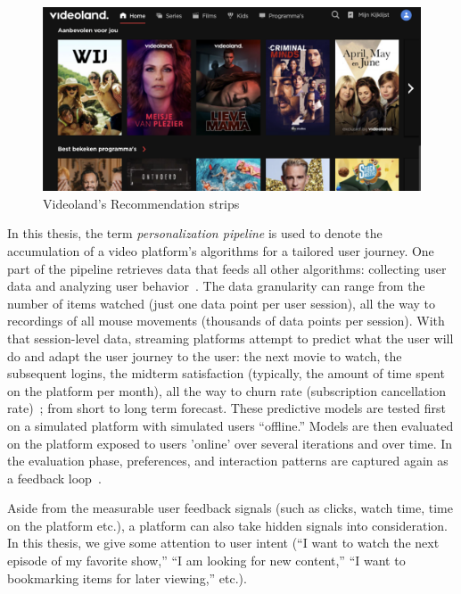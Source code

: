 \begin{figure}[h]
  \centering
  \includegraphics[width=\textwidth]{images/VLHome_cropped.png}
  \caption{Videoland's Recommendation strips}
  \label{fig:VLStrip}
\end{figure}

In this thesis, the term \emph{personalization pipeline} is used to denote the accumulation of a video platform's algorithms for a tailored user journey. 
One part of the pipeline retrieves data that feeds all other algorithms: collecting user data and analyzing user behavior~\cite{behaviorals}.
The data granularity can range from the number of items watched (just one data point per user session), all the way to recordings of all mouse movements (thousands of data points per session). With that session-level data, streaming platforms attempt to predict what the user will do and adapt the user journey to the user: the next movie to watch, the subsequent logins, the midterm satisfaction (typically, the amount of time spent on the platform per month), all the way to churn rate (subscription cancellation rate)~\cite{longTerm}; from short to long term forecast. These predictive models are tested first on a simulated platform with simulated users ``offline.'' 
Models are then evaluated on the platform exposed to users 'online' over several iterations and over time. In the evaluation phase, preferences, and interaction patterns are captured again as a feedback loop~\cite{offlineOnlineSurvey, NetflixReco}. 

Aside from the measurable user feedback signals (such as clicks, watch time, time on the platform etc.), a platform can also take hidden signals into consideration. In this thesis, we give some attention to user intent (``I want to watch the next episode of my favorite show,'' ``I am looking for new content,'' ``I want to bookmarking items for later viewing,'' etc.). 

